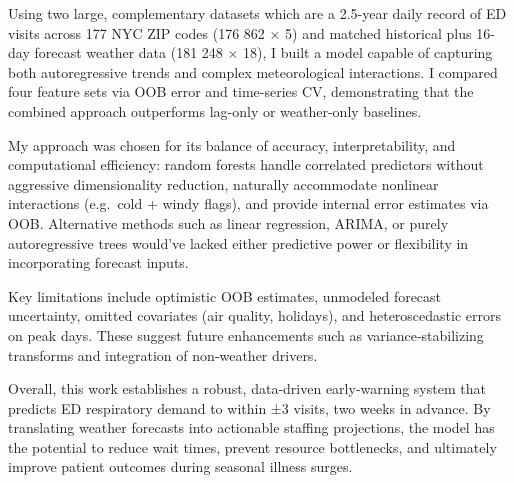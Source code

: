 \documentclass[11pt]{article}
\begin{document}
Using two large, complementary datasets which are a 2.5-year daily record of ED visits across 177 NYC ZIP codes (176 862 × 5) and matched historical plus 16-day forecast weather data (181 248 × 18), I built a model capable of capturing both autoregressive trends and complex meteorological interactions. I compared four feature sets via OOB error and time-series CV, demonstrating that the combined approach outperforms lag-only or weather-only baselines.  

My approach was chosen for its balance of accuracy, interpretability, and computational efficiency: random forests handle correlated predictors without aggressive dimensionality reduction, naturally accommodate nonlinear interactions (e.g.\ cold + windy flags), and provide internal error estimates via OOB.  Alternative methods such as linear regression, ARIMA, or purely autoregressive trees would've lacked either predictive power or flexibility in incorporating forecast inputs.

Key limitations include optimistic OOB estimates, unmodeled forecast uncertainty, omitted covariates (air quality, holidays), and heteroscedastic errors on peak days. These suggest future enhancements such as variance‐stabilizing transforms and integration of non‐weather drivers.  

Overall, this work establishes a robust, data‐driven early‐warning system that predicts ED respiratory demand to within ±3 visits, two weeks in advance.  By translating weather forecasts into actionable staffing projections, the model has the potential to reduce wait times, prevent resource bottlenecks, and ultimately improve patient outcomes during seasonal illness surges.  
\end{document}
